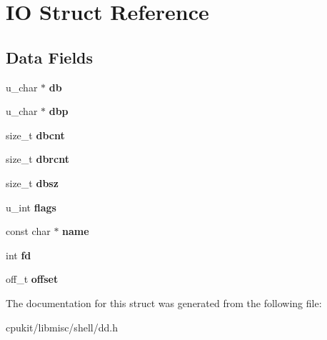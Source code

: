 \hypertarget{structIO}{}\section{IO Struct Reference}
\label{structIO}
\subsection*{Data Fields}
\begin{DoxyCompactItemize}
\item 
\mbox{\label{structIO_aea270b85dc4cc0f16d568c36ebf04c22}} 
u\+\_\+char $\ast$ {\bfseries db}
\item 
\mbox{\label{structIO_a74ad8f878826281592bd384bccb536cf}} 
u\+\_\+char $\ast$ {\bfseries dbp}
\item 
\mbox{\label{structIO_a4f4334cddcb40c4accc7a4dab5c06a44}} 
size\+\_\+t {\bfseries dbcnt}
\item 
\mbox{\label{structIO_a65e12989e8dc71d228b36f338cd34fb5}} 
size\+\_\+t {\bfseries dbrcnt}
\item 
\mbox{\label{structIO_a8ee4cd2cebe885d17b623e6656fd9923}} 
size\+\_\+t {\bfseries dbsz}
\item 
\mbox{\label{structIO_a74c65d7d760bd39d0139dfef20e995a9}} 
u\+\_\+int {\bfseries flags}
\item 
\mbox{\label{structIO_ad534a512bbac9ddebd3b0eda715e717f}} 
const char $\ast$ {\bfseries name}
\item 
\mbox{\label{structIO_a1a049a9bf4648ae23be5c56135eebdd1}} 
int {\bfseries fd}
\item 
\mbox{\label{structIO_a9f2519ea6d7b0c0aa4382f11c029a42c}} 
off\+\_\+t {\bfseries offset}
\end{DoxyCompactItemize}


The documentation for this struct was generated from the following file\+:\begin{DoxyCompactItemize}
\item 
cpukit/libmisc/shell/dd.\+h\end{DoxyCompactItemize}
